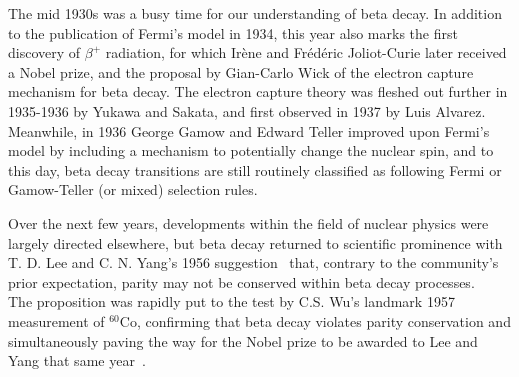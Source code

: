 The mid 1930s was a busy time 
for our understanding of beta decay.  In addition to the publication of Fermi's model in 1934, this year also marks the first discovery of $\beta^+$ radiation, for which Irène and Frédéric Joliot-Curie later received a Nobel prize, and the proposal by Gian-Carlo Wick of the electron capture mechanism for beta decay.  
The electron capture theory was fleshed out further in 1935-1936 by Yukawa and Sakata, and first observed in 1937 by Luis Alvarez.  Meanwhile, in 1936 George Gamow and Edward Teller improved upon Fermi's model by including a mechanism to potentially change the nuclear spin\cite{GamowTeller}, and to this day, beta decay transitions are still routinely classified as following Fermi or Gamow-Teller (or mixed) selection rules.

Over the next few years, developments within the field of nuclear physics were largely directed elsewhere, but beta decay returned to scientific prominence with T. D. Lee and C. N. Yang's 1956 suggestion~ 
that, contrary to the community's prior expectation, parity may not be conserved within beta decay processes\cite{LeeYang}.
~  The proposition was rapidly put to the test by C.S. Wu's landmark 1957 measurement of $^{60}$Co, confirming that beta decay violates parity conservation and simultaneously paving the way for the Nobel prize to be awarded to Lee and Yang that same year~\cite{wu}.~
~

